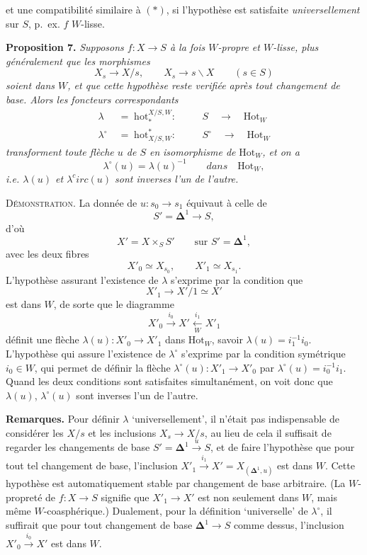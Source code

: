 \documentclass[11pt]{article}
\newcommand{\printedpage}[1]{\marginpar{\footnotesize p.~#1}}
\newcommand{\msp}[1]{\marginpar{\footnotesize [#1]}}
\newcommand{\Hot}{\mathrm{Hot}}
\newcommand{\hot}{\mathrm{hot}}
\begin{document}
\leavevmode\msp{page 35}et une compatibilité similaire à $(*)$, si l'hypothèse est satisfaite \textit{universellement} sur $S$, p.~ex. $f$ $W$-lisse.

\textbf{Proposition 7.} \textit{Supposons $f : X\longrightarrow S$ à la fois $W$-propre et $W$-lisse, plus généralement que les morphismes}
\[
X_s\longrightarrow X/s,\qquad X_s\longrightarrow s\backslash X\qquad(s\in S)
\]
\textit{soient dans $W$, et que cette hypothèse reste verifiée après tout changement de base. Alors les foncteurs correspondants} %
\[
\begin{aligned}
\lambda &\;=\;\hot_*^{X/S,W} : &&\quad S \quad\longrightarrow\quad \Hot_W\\
\lambda^\circ &\;=\;\hot^*_{X/S,W} : &&\quad S^\circ \quad\longrightarrow\quad \Hot_W
\end{aligned}
\]
\textit{transforment toute flèche $u$ de $S$ en} \textit{isomorphisme de} $\Hot_W$\textit{, et on a}
\[
\lambda^\circ(u)=\lambda(u)^{-1}\qquad\textit{dans}\quad\Hot_W,
\]
\textit{i.e. $\lambda(u)$ et $\lambda^c irc(u)$ sont inverses l'un de l'autre.} %

\textsc{Démonstration}. La donnée de $u : s_0\longrightarrow s_1$ équivaut à celle de
\[
S'=\mathbf{\Delta}^1\longrightarrow S,
\]
d'où
\[
X'=X\times_S S'\qquad\text{sur } S'=\mathbf{\Delta}^1,
\]
avec les deux fibres
\[
X'_0\simeq X_{s_0},\qquad X'_1\simeq X_{s_1}.
\]
L'hypothèse assurant l'existence de $\lambda$ s'exprime par la condition que
\[
X'_1\longrightarrow X'/1\simeq X'
\]
\printedpage{28}
\msp{page 36}est dans $W$, de sorte que le diagramme
\[
X'_0\xrightarrow{i_0}X'\xleftarrow[W]{i_1}X'_1
\]
définit une flèche $\lambda(u) : X'_0\longrightarrow X'_1$ dans $\Hot_W$, savoir $\lambda(u)=i_1^{-1}i_0$. L'hypothèse qui assure l'existence de $\lambda^\circ$ s'exprime par la condition symétrique $i_0\in W$, qui permet de définir la flèche $\lambda^\circ(u) : X'_1\longrightarrow X'_0$ par $\lambda^\circ(u)=i_0^{-1}i_1$. Quand les deux conditions sont satisfaites simultanément, on voit donc que $\lambda(u)$, $\lambda^\circ(u)$ sont inverses l'un de l'autre.

\textbf{Remarques.} Pour définir $\lambda$ `universellement', il n'était pas indispensable de considérer les $X/s$ et les inclusions $X_s\longrightarrow X/s$, au lieu de cela il suffisait de regarder les changements de base $S'=\mathbf{\Delta}^1\xrightarrow{u}S$, et de faire l'hypothèse que pour tout tel changement de base, l'inclusion $X'_1\xrightarrow{i_1}X'=X_{(\mathbf{\Delta}^1,u)}$ est dans $W$. Cette hypothèse est automatiquement stable par changement de base arbitraire. (La $W$-propreté de $f : X\longrightarrow S$ signifie que $X'_1\longrightarrow X'$ est non seulement dans $W$, mais même $W$-coasphérique.) Dualement, pour la définition `universelle' de $\lambda^\circ$, il suffirait que pour tout changement de base $\mathbf{\Delta}^1\longrightarrow S$ comme dessus, l'inclusion $X'_0\xrightarrow{i_0}X'$ est dans $W$.
\end{document}
